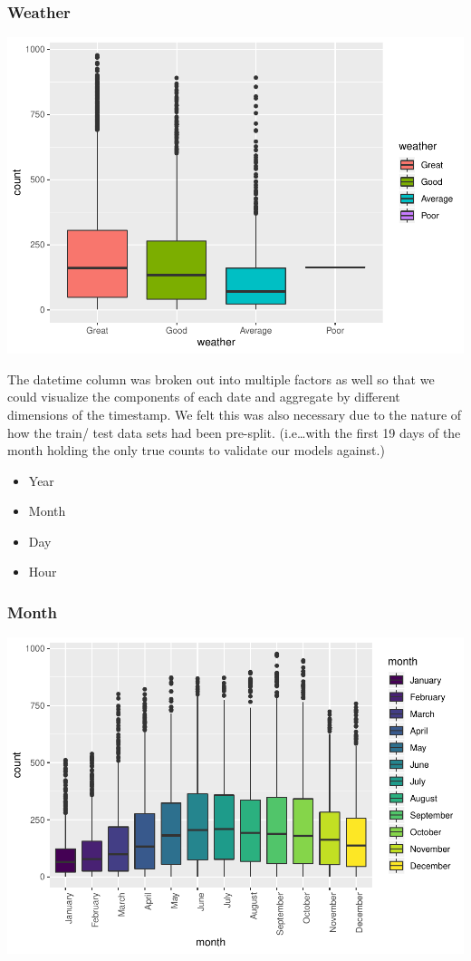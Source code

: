 \documentclass[american,]{article}
\providecommand{\tightlist}{%
  \setlength{\itemsep}{0pt}\setlength{\parskip}{0pt}}
\begin{document}
\hypertarget{weather}{%
\subsubsection{Weather}\label{weather}}

\includegraphics{BikeSharingDemand_files/figure-latex/train.mod.1.weather-1.pdf}

The datetime column was broken out into multiple factors as well so that we could visualize the components of each date and aggregate by different dimensions of the timestamp. We felt this was also necessary due to the nature of how the train/ test data sets had been pre-split. (i.e\ldots{}with the first 19 days of the month holding the only true counts to validate our models against.)

\begin{itemize}
\tightlist
\item
  Year
\item
  Month
\item
  Day
\item
  Hour
\end{itemize}

\hypertarget{month}{%
\subsubsection{Month}\label{month}}

\includegraphics{BikeSharingDemand_files/figure-latex/train.mod.1.month-1.pdf}
\end{document}
